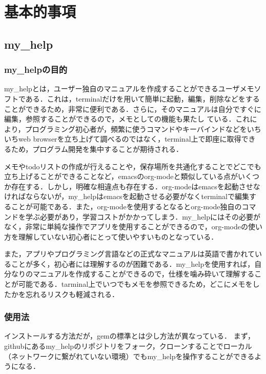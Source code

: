 \chapter{基本的事項}\label{ux57faux672cux7684ux4e8bux9805}

\section{my\_help}\label{my_help}

\subsection{my\_helpの目的}\label{my_helpux306eux76eeux7684}

my\_helpとは，ユーザー独自のマニュアルを作成することができるユーザメモソフトである．これは，terminalだけを用いて簡単に起動，編集，削除などをすることができるため，非常に便利である．さらに，そのマニュアルは自分ですぐに編集，参照することができるので，メモとしての機能も果たし
ている．これにより，プログラミング初心者が，頻繁に使うコマンドやキーバインドなどをいちいちweb
browserを立ち上げて調べるのではなく，terminal上で即座に取得できるため，プログラム開発を集中することが期待される．

メモやtodoリストの作成が行えることや，保存場所を共通化することでどこでも立ち上げることができることなど，emacsのorg-modeと類似している点がいくつか存在する．しかし，明確な相違点も存在する．org-modeはemacsを起動させなければならないが，my\_helpはemacsを起動させる必要がなくterminalで編集することが可能である．また，org-modeを使用するとなるとorg-mode独自のコマンドを学ぶ必要があり，学習コストがかかってしまう．my\_helpにはその必要がなく，非常に単純な操作でアプリを使用することができるので，org-modeの使い方を理解していない初心者にとって使いやすいものとなっている．

また，アプリやプログラミング言語などの正式なマニュアルは英語で書かれていることが多く，初心者には理解するのが困難である．my\_helpを使用すれば，自分なりのマニュアルを作成することができるので，仕様を噛み砕いて理解することが可能である．tarminal上でいつでもメモを参照できるため，どこにメモをしたかを忘れるリスクも軽減される．

\subsection{使用法}\label{ux4f7fux7528ux6cd5}

インストールする方法だが，gemの標準とは少し方法が異なっている．
まず，githubにあるmy\_helpのリポジトリをフォーク，クローンすることでローカル（ネットワークに繋がれていない環境）でもmy\_helpを操作することができるようになる．


